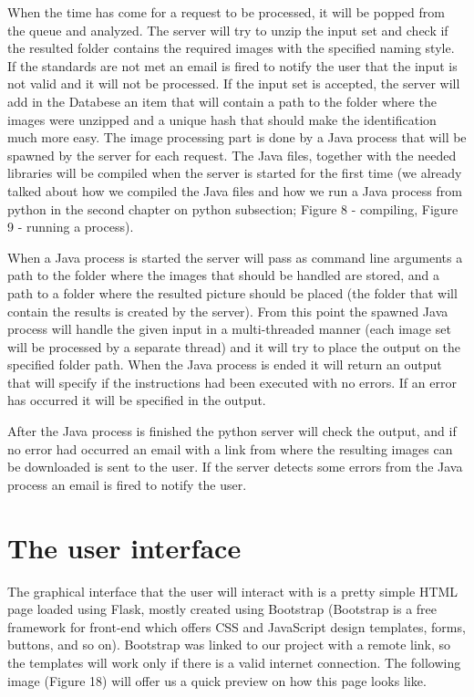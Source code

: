 \documentclass[12pt, a4paper]{report}
\begin{document}
When the time has come for a request to be processed, it will be popped from the queue and analyzed. The server will try to unzip the input set and check if the resulted folder contains the required images with the specified naming style. If the standards are not met an email is fired to notify the user that the input is not valid and it will not be processed. If the input set is accepted, the server will add in the Databese an item that will contain a path to the folder where the images were unzipped and a unique hash that should make the identification much more easy. The image processing part is done by a Java process that will be spawned by the server for each request. The Java files, together with the needed libraries will be compiled when the server is started for the first time (we already talked about how we compiled the Java files and how we run a Java process from python in the second chapter on python subsection; Figure 8 - compiling, Figure 9 - running a process). 
\par 

When a Java process is started the server will pass as command line arguments a path to the folder where the images that should be handled are stored, and a path to a folder where the resulted picture should be placed (the folder that will contain the results is created by the server). From this point the spawned Java process will handle the given input in a multi-threaded manner (each image set will be processed by a separate thread) and it will try to place the output on the specified folder path. When the Java process is ended it will return an output that will specify if the instructions had been executed with no errors. If an error has occurred it will be specified in the output. 
\par 

After the Java process is finished the python server will check the output, and if no error had occurred an email with a link from where the resulting images can be downloaded is sent to the user. If the server detects some errors from the Java process an email is fired to notify the user.



\newpage
\section{The user interface}

\quad
The graphical interface that the user will interact with is a pretty simple HTML page loaded using Flask, mostly created using Bootstrap (Bootstrap is a free framework for front-end which offers CSS and JavaScript design templates, forms, buttons, and so on). Bootstrap was linked to our project with a remote link, so the templates will work only if there is a valid internet connection. The following image (Figure 18) will offer us a quick preview on how this page looks like.
\end{document}
